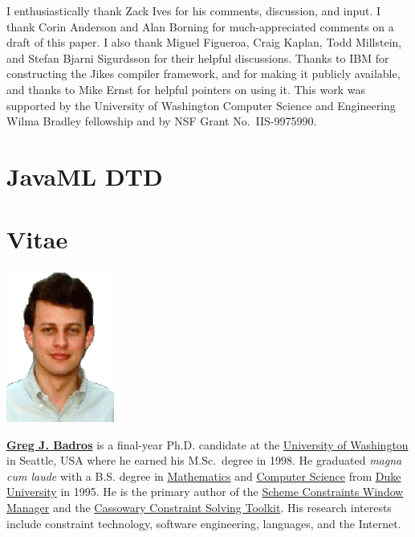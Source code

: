 \documentclass{article}
\begin{document}
\begin{multicols}{2}
I enthusiastically thank Zack Ives for his comments, discussion, and
input.  I thank Corin Anderson and Alan Borning for much-appreciated
comments on a draft of this paper.  I also thank Miguel Figueroa, Craig
Kaplan, Todd Millstein, and Stefan Bjarni Sigurdsson for their
helpful discussions. Thanks to IBM for constructing the Jikes compiler
framework, and for making it publicly available, and thanks to Mike
Ernst for helpful pointers on using it. This work was supported by the
University of Washington Computer Science and Engineering Wilma Bradley
fellowship and by NSF Grant No.~IIS-9975990.

\appendix
\section{JavaML DTD}
\label{app-javaml-dtd}

{\small

}

{\small
}


\section*{Vitae}
\begin{floatingfigure}[l]{1.2in}
\hspace*{-.8cm}
\includegraphics[width=1.4in]{gjb-face.eps}
\end{floatingfigure}

\textbf{\href{http://www.cs.washington.edu/homes/gjb}{Greg J. Badros}}
is a final-year Ph.D. candidate at the
\href{http://www.cs.washington.edu}{University of Washington} 
in Seattle, USA where he earned his M.Sc.\  degree in 1998.  
He graduated \textit{magna cum laude} with a B.S.
degree in \href{http://www.math.duke.edu}{Mathematics} and 
\href{http://www.cs.duke.edu}{Computer Science} from
\href{http://www.duke.edu}{Duke University} in 1995.  He is the 
primary author of the 
\href{http://scwm.mit.edu}{Scheme Constraints Window Manager} and the 
\href{http://www.cs.washington.edu/research/constraints/cassowary}{Cassowary
Constraint Solving Toolkit}.  His research interests include
constraint technology, software engineering, languages, and the
Internet.

\end{multicols}
\end{document}
